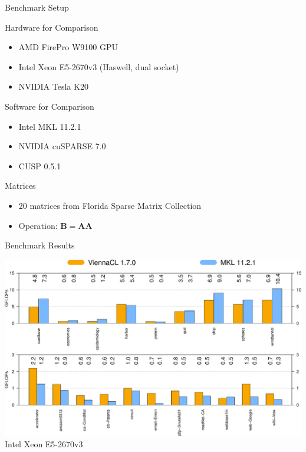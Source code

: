 \begin{frame}{Benchmark Setup}

 \begin{block}{Hardware for Comparison}
  \begin{itemize}
   \item AMD FirePro W9100 GPU
   \item Intel Xeon E5-2670v3 (Haswell, dual socket)
   \item NVIDIA Tesla K20
  \end{itemize}
 \end{block}

  \begin{block}{Software for Comparison}
  \begin{itemize}
   \item Intel MKL 11.2.1
   \item NVIDIA cuSPARSE 7.0
   \item CUSP 0.5.1
  \end{itemize}
 \end{block}

 \begin{block}{Matrices}
  \begin{itemize}
   \item 20 matrices from Florida Sparse Matrix Collection
   \item Operation: $\mathbf{B} = \mathbf{A}\mathbf{A}$
  \end{itemize}
 \end{block}

\end{frame}


\begin{frame}{Benchmark Results}
 \begin{center}
  \includegraphics[width=0.999\textwidth]{figures/spgemm_cpu} \\
  Intel Xeon E5-2670v3
 \end{center}
\end{frame}

